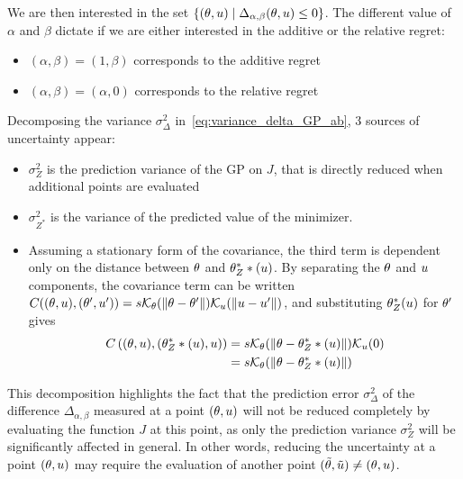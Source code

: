 \documentclass[../../Main_ManuscritThese.tex]{subfiles}
\begin{document}
We are then interested in the set $\{(\theta, u) \mid \Delta_{\alpha, \beta}(\theta, u) \leq 0\}$. The different value of $\alpha$ and $\beta$ dictate if we are either interested in the additive or the relative regret:
\begin{itemize}
\item $(\alpha, \beta) = (1, \beta)$ corresponds to the additive regret
\item $(\alpha, \beta) = (\alpha, 0)$ corresponds to the relative regret
\end{itemize}


Decomposing the variance $\sigma^2_{\Delta}$ in~\cref{eq:variance_delta_GP_ab}, 3 sources of uncertainty appear:
\begin{itemize}
\item $\sigma^2_{Z}$ is the prediction variance of the GP on $J$, that is directly reduced when additional points are evaluated
\item $\sigma^2_{Z^*}$ is the variance of the predicted value of the minimizer.
\item Assuming a stationary form of the covariance, the third term is dependent only on the distance between $\theta$ and $\theta^*_Z*(u)$. By separating the $\theta$ and $u$ components, the covariance term can be written $C((\theta,u), (\theta^{\prime},u^{\prime})) = s \mathcal{K}_{\theta}(\|\theta - \theta^{\prime}\|) \mathcal{K}_{u}(\|u - u^{\prime}\|)$, and
  substituting $\theta^*_Z(u)$ for $\theta^{\prime}$ gives
\begin{align}
  C\left((\theta,u),(\theta^*_Z*(u),u)\right) &= s  \mathcal{K}_{\theta}(\|\theta - \theta^*_Z*(u)\|) \mathcal{K}_{u}(0) \\
                                           &= s  \mathcal{K}_{\theta}(\|\theta - \theta^*_Z*(u)\|)
\end{align}
\end{itemize}
This decomposition highlights the fact that the prediction error $\sigma_{\Delta}^2$ of the difference $\Delta_{\alpha,\beta}$ measured at a point $(\theta, u)$ will not be reduced completely by evaluating the function $J$ at this point, as only the prediction variance $\sigma_Z^2$ will be significantly affected in general. In other words, reducing the uncertainty at a point $(\theta, u)$ may require the evaluation of another point $(\tilde{\theta},\tilde{u}) \neq (\theta, u)$.
\end{document}
